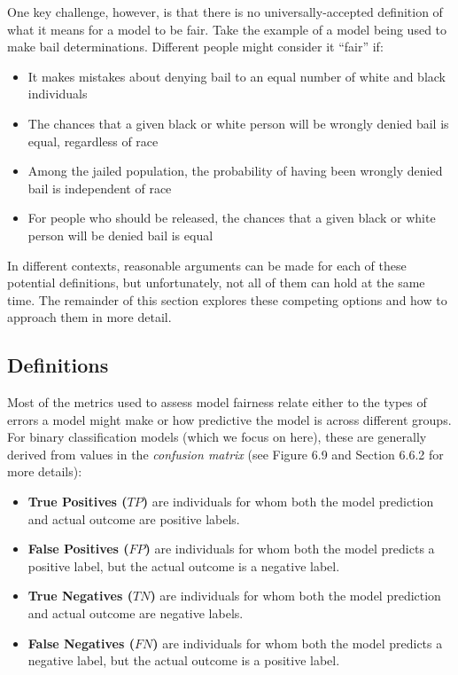 \documentclass[]{krantz}
\begin{document}
One key challenge, however, is that there is no universally-accepted
definition of what it means for a model to be fair. Take the example of
a model being used to make bail determinations. Different people might
consider it ``fair'' if:

\begin{itemize}
\item
  It makes mistakes about denying bail to an equal number of white and
  black individuals
\item
  The chances that a given black or white person will be wrongly denied
  bail is equal, regardless of race
\item
  Among the jailed population, the probability of having been wrongly
  denied bail is independent of race
\item
  For people who should be released, the chances that a given black or
  white person will be denied bail is equal
\end{itemize}

In different contexts, reasonable arguments can be made for each of
these potential definitions, but unfortunately, not all of them can hold
at the same time. The remainder of this section explores these competing
options and how to approach them in more detail.

\subsection{Definitions}\label{definitions}

Most of the metrics used to assess model fairness relate either to the
types of errors a model might make or how predictive the model is across
different groups. For binary classification models (which we focus on
here), these are generally derived from values in the \emph{confusion
matrix} (see Figure 6.9 and Section 6.6.2 for more details):

\begin{itemize}
\item
  \textbf{True Positives (\(TP\))} are individuals for whom both the
  model prediction and actual outcome are positive labels.
\item
  \textbf{False Positives (\(FP\))} are individuals for whom both the
  model predicts a positive label, but the actual outcome is a negative
  label.
\item
  \textbf{True Negatives (\(TN\))} are individuals for whom both the
  model prediction and actual outcome are negative labels.
\item
  \textbf{False Negatives (\(FN\))} are individuals for whom both the
  model predicts a negative label, but the actual outcome is a positive
  label.
\end{itemize}
\end{document}
